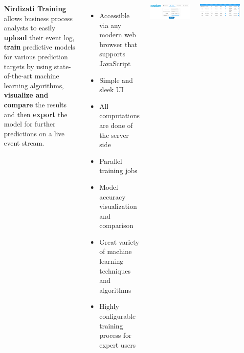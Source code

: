 \documentclass[24pt, a0paper, landscape]{tikzposter}
\begin{document}
\begin{columns}
{\begin{multicols}{2}
        \end{multicols}

        }


        {
        \textbf{Nirdizati Training} allows business process analysts to easily \textbf{upload} their event log, \textbf{train}
        predictive models for various prediction targets by using state-of-the-art machine learning algorithms, \textbf{visualize and compare} the results
        and then \textbf{export} the model for further predictions on a live event stream.
        }

        {
        \begin{itemize}
            \item Accessible via any modern web browser that supports JavaScript
            \item Simple and sleek UI
            \item All computations are done of the server side
            \item Parallel training jobs
            \item Model accuracy visualization and comparison
            \item Great variety of machine learning techniques and algorithms
            \item Highly configurable training process for expert users
        \end{itemize}
        }

        {
        \begin{tikzfigure}
            \includegraphics{figures/training.png}
        \end{tikzfigure}

        \begin{tikzfigure}
            \includegraphics{figures/validation2.png}
        \end{tikzfigure}
    
}
\end{columns}
\end{document}
